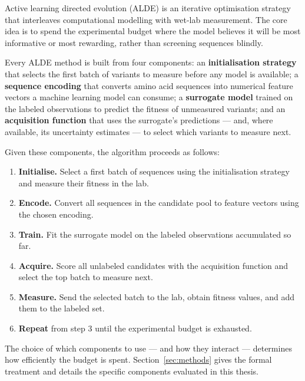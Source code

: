 Active learning directed evolution (ALDE) is an iterative optimisation strategy that interleaves computational modelling with wet-lab measurement. The core idea is to spend the experimental budget where the model believes it will be most informative or most rewarding, rather than screening sequences blindly.

Every ALDE method is built from four components: an \textbf{initialisation strategy} that selects the first batch of variants to measure before any model is available; a \textbf{sequence encoding} that converts amino acid sequences into numerical feature vectors a machine learning model can consume; a \textbf{surrogate model} trained on the labeled observations to predict the fitness of unmeasured variants; and an \textbf{acquisition function} that uses the surrogate's predictions — and, where available, its uncertainty estimates — to select which variants to measure next.

Given these components, the algorithm proceeds as follows:

\begin{enumerate}
  \item \textbf{Initialise.} Select a first batch of sequences using the initialisation strategy and measure their fitness in the lab.
  \item \textbf{Encode.} Convert all sequences in the candidate pool to feature vectors using the chosen encoding.
  \item \textbf{Train.} Fit the surrogate model on the labeled observations accumulated so far.
  \item \textbf{Acquire.} Score all unlabeled candidates with the acquisition function and select the top batch to measure next.
  \item \textbf{Measure.} Send the selected batch to the lab, obtain fitness values, and add them to the labeled set.
  \item \textbf{Repeat} from step 3 until the experimental budget is exhausted.
\end{enumerate}

The choice of which components to use — and how they interact — determines how efficiently the budget is spent. Section~\ref{sec:methods} gives the formal treatment and details the specific components evaluated in this thesis.
